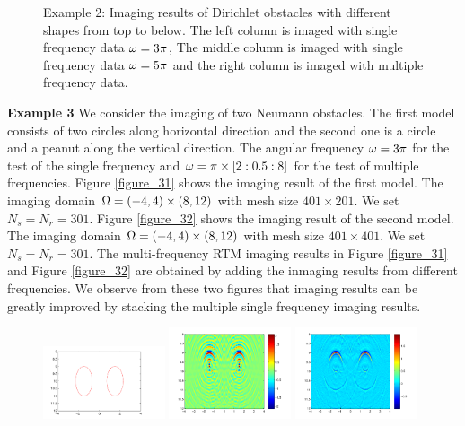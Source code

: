 \documentclass[12pt]{iopart}
\begin{document}
{\begin{figure}
	\caption{Example 2: Imaging results of Dirichlet obstacles
		with different shapes from top to below. The left column is imaged with single frequency data $\omega=3\pi$, The middle column is imaged with single frequency data $\omega=5\pi$ and the right column is imaged with multiple frequency data.}\label{figure_2}
\end{figure}

\bigskip
\textbf{Example 3} We consider the imaging of two Neumann obstacles. The first model
consists of two circles along horizontal direction and the second one is a circle and a
peanut along the vertical direction. The angular frequency $\omega=3\pi$ for the test of the single frequency and $\omega=\pi\times[2:0.5:8]$ for the test of multiple frequencies. Figure \ref{figure_31} shows the imaging result of the first model. The
imaging domain $\Omega=(-4, 4) \times (8,12)$ with mesh size $401 \times 201$. We set $N_s = N_r = 301$. Figure \ref{figure_32}
 shows the imaging result of the second model. The
 imaging domain $\Omega=(-4, 4)\times (8,12)$ with mesh size $401 \times 401$. We set $N_s = N_r = 301$. The multi-frequency RTM imaging results in Figure \ref{figure_31} and Figure \ref{figure_32} are obtained by adding the inmaging results from different frequencies. We observe from these two figures that imaging results can be greatly improved by stacking the multiple single frequency imaging results. 
\begin{figure}
	\centering
	\includegraphics[width=0.32\textwidth,height=0.16\textheight]{./graphic/bi_circle_profile-eps-converted-to.pdf}
	\includegraphics[width=0.32\textwidth]{./graphic/bi_circle_3pi-eps-converted-to.pdf}
	\includegraphics[width=0.32\textwidth]{./graphic/bi_circle-eps-converted-to.pdf}
	

\end{figure}}
\end{document}
